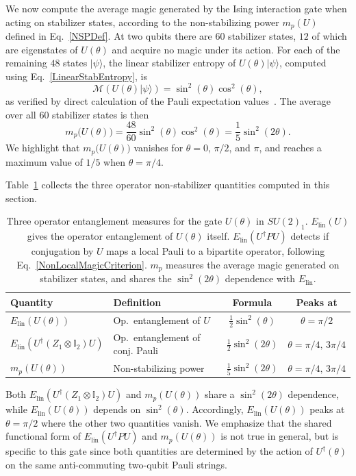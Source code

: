\documentclass[12pt,a4paper]{article}
\def\ket#1{{|{#1}\rangle}}
\begin{document}
We now compute the average magic generated by the Ising interaction gate when acting on stabilizer states, according to the non-stabilizing power $m_p(U)$ defined in Eq.\ \eqref{NSPDef}. At two qubits there are $60$ stabilizer states, $12$ of which are eigenstates of $U(\theta)$ and acquire no magic under its action. For each of the remaining $48$ states $\ket{\psi}$, the linear stabilizer entropy of $U(\theta)\ket{\psi}$, computed using Eq.\ \eqref{LinearStabEntropy}, is
%
\begin{equation}
    \mathcal{M}(U(\theta)|\psi\rangle) = \sin^2(\theta)\cos^2(\theta),
\end{equation}
%
as verified by direct calculation of the Pauli expectation values~\cite{Varikuti:2025poy}. The average over all $60$ stabilizer states is then
%
\begin{equation}\label{NSPResult}
m_p\bigl(U(\theta)\bigr) = \frac{48}{60}\sin^2(\theta)\cos^2(\theta) = \frac{1}{5}\sin^2(2\theta).
\end{equation}
%
We highlight that $m_p\bigl(U(\theta)\bigr)$ vanishes for $\theta = 0$, $\pi/2$, and $\pi$, and reaches a maximum value of $1/5$ when $\theta = \pi/4$.

Table~\ref{tab:three_measures} collects the three operator non-stabilizer quantities computed in this section.
%
\begin{table}[h]
\centering
\renewcommand{\arraystretch}{1.4}
\begin{tabular}{llcc}
\hline
Quantity & Definition & Formula & Peaks at \\
\hline
$E_{\mathrm{lin}}(U(\theta))$ & Op.\ entanglement of $U$ & $\frac{1}{2}\sin^2(\theta)$ & $\theta = \pi/2$ \\
$E_{\mathrm{lin}}(U^\dagger(Z_1\otimes\mathbb{I}_2)U)$ & Op.\ entanglement of conj. Pauli & $\frac{1}{2}\sin^2(2\theta)$ & $\theta = \pi/4,\,3\pi/4$ \\
$m_p(U(\theta))$ & Non-stabilizing power & $\frac{1}{5}\sin^2(2\theta)$ & $\theta = \pi/4,\,3\pi/4$ \\
\hline
\end{tabular}
\caption{Three operator entanglement measures for the gate $U(\theta)$ in $SU(2)_1$. $E_{\mathrm{lin}}(U)$ gives the operator entanglement of $U(\theta)$ itself. $E_{\mathrm{lin}}(U^\dagger PU)$ detects if conjugation by $U$ maps a local Pauli to a bipartite operator, following Eq.\ \eqref{NonLocalMagicCriterion}. $m_p$ measures the average magic generated on stabilizer states, and shares the $\sin^2(2\theta)$ dependence with $E_{\mathrm{lin}}$.}
\label{tab:three_measures}
\end{table}
%
Both $E_{\mathrm{lin}}(U^\dagger(Z_1\otimes\mathbb{I}_2)U)$ and $m_p(U(\theta))$ share a $\sin^2(2\theta)$ dependence, while $E_{\mathrm{lin}}(U(\theta))$ depends on $\sin^2(\theta)$. Accordingly, $E_{\mathrm{lin}}(U(\theta))$ peaks at $\theta = \pi/2$ where the other two quantities vanish. We emphasize that the shared functional form of $E_{\mathrm{lin}}(U^\dagger PU)$ and $m_p(U(\theta))$ is not true in general, but is specific to this gate since both quantities are determined by the action of $U^{\dagger}(\theta)$ on the same anti-commuting two-qubit Pauli strings.
\end{document}
